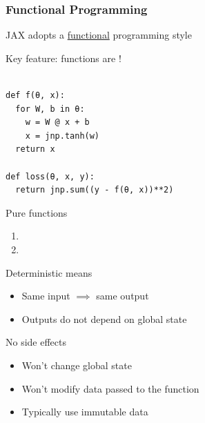 \begin{frame}[fragile]
    \frametitle{Functional Programming}
    
    JAX adopts a \underline{functional} programming style

    \vspace{0.5em}
    Key feature: functions are !


    \begin{verbatim}

def f(θ, x):
  for W, b in θ:
    w = W @ x + b
    x = jnp.tanh(w)  
  return x

def loss(θ, x, y):
  return jnp.sum((y - f(θ, x))**2)

    \end{verbatim}


\end{frame}

\begin{frame}
    
    Pure functions

    \begin{enumerate}
        \item {}
        \vspace{0.5em}
        \item {}
    \end{enumerate}


    Deterministic means

    \begin{itemize}
        \item Same input $\implies$ same output 
        \vspace{0.5em}
        \item Outputs do not depend on global state
    \end{itemize}


    No side effects

    \begin{itemize}
        \item Won't change global state
        \vspace{0.5em}
        \item Won't modify data passed to the function
        \vspace{0.5em}
        \item Typically use immutable data
    \end{itemize}

\end{frame}


